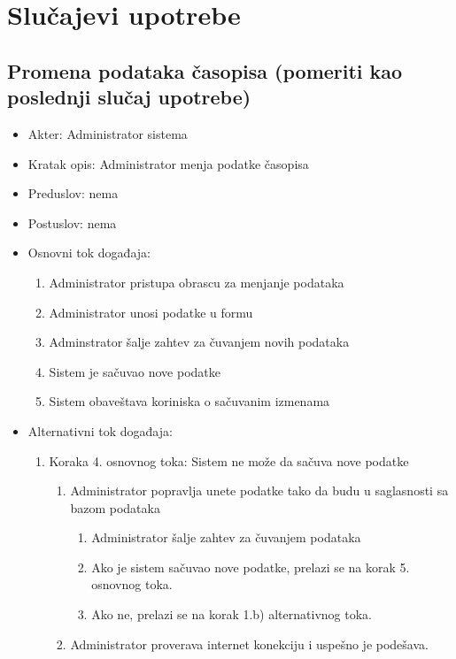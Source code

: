 \documentclass[a4paper]{article}
\begin{document}
\section{Slučajevi upotrebe}

\subsection{Promena podataka časopisa (pomeriti kao poslednji slučaj upotrebe)}
\begin{itemize}
    \item Akter: Administrator sistema
    \item Kratak opis: Administrator menja podatke časopisa
    \item Preduslov: nema
    \item Postuslov: nema
    \item Osnovni tok događaja:
        \begin{enumerate}
            \item Administrator pristupa obrascu za menjanje podataka
            \item Administrator unosi podatke u formu
            \item Adminstrator šalje zahtev za čuvanjem novih podataka
            \item Sistem je sačuvao nove podatke
            \item Sistem obaveštava koriniska o sačuvanim izmenama
        \end{enumerate}
    \item Alternativni tok događaja:
        \begin{enumerate}
            \item Koraka 4. osnovnog toka: Sistem ne može da sačuva nove podatke
                \begin{enumerate}
                    \item Administrator popravlja unete podatke tako da budu u saglasnosti sa bazom podataka
                    \begin{enumerate}
                        \item Administrator šalje zahtev za čuvanjem podataka
                        \item Ako je sistem sačuvao nove podatke, prelazi se na korak 5. osnovnog toka.
                        \item Ako ne, prelazi se na korak 1.b) alternativnog toka.
                    \end{enumerate}
                    \item Administrator proverava internet konekciju i uspešno je podešava.

\end{enumerate}
\end{enumerate}
\end{itemize}
\end{document}
